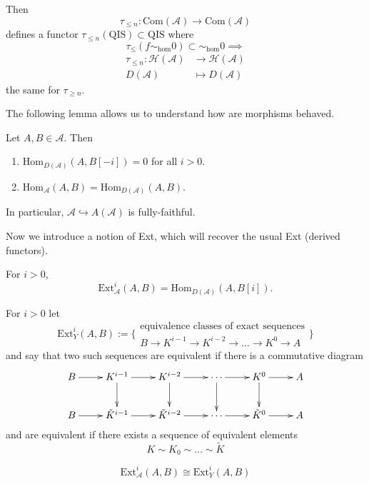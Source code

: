 Then
$$
\tau_{\leq n}:\text{Com}(\mathcal{A}) \to
\text{Com}(\mathcal{A})
$$
defines a functor $\tau_{\leq
n}(\text{QIS})\subset \text{QIS}$ where
$$
\tau_{\leq }(f \sim _{\text{hom}}0) \subset
\sim_{\text{hom}}0
\implies
$$
$$
\begin{aligned}
\tau_{\leq n}: \mathcal{H}(\mathcal{A})
&\longrightarrow
\mathcal{H}(\mathcal{A}) \\
D(\mathcal{A}) &\longmapsto D(\mathcal{A})
\end{aligned}
$$
the same for $\tau_{\geq n}$.

\medskip
The following lemma allows us to understand
how are morphisms behaved.

\begin{lemma}
\label{lemma-Homs}
Let $A,B \in \mathcal{A}$. Then
\begin{enumerate}
\item
$\text{Hom}_{D(\mathcal{A})}(A,B[-i])=0$ for
all $i>0$.
\item
$\text{Hom}_{\mathcal{A}}(A,B)=\text{Hom}
_{D(\mathcal{A})}(A,B)$.
\end{enumerate}
In particular, $\mathcal{A} \hookrightarrow
A(\mathcal{A})$ is fully-faithful.
\end{lemma}

Now we introduce a notion of Ext, which will
recover the usual Ext (derived functors).

\begin{definition}
\label{definition-Ext}
For $i>0$,
$$
\text{Ext}^i_{\mathcal{A}}(A,B)=\text{Hom}
_{D(\mathcal{A})}(A,B[i]).
$$
\end{definition}
\begin{definition}[Yoneda]
\label{definition-Yoneda}
For $i>0$ let
$$
\text{Ext}_Y^i(A,B):=
\{\substack{\text{equivalence
classes of exact sequences}\\
B\to K^{i-1}\to K^{i-2}\to \ldots \to K^0 \to
A}\}
$$
and say that two such sequences are
equivalent if there is a commutative diagram
$$
\xymatrix{
B\ar[r]&  K^{i-1}\ar[r]\ar[d]&
K^{i-2}\ar[r]\ar[d]& \cdots\ar[r]\ar[d]
&K^0\ar[r]\ar[d]&A\\
B\ar[r]&  \tilde{K}^{i-1}\ar[r]&
\tilde{K}^{i-2}\ar[r]& \cdots\ar[r]
&\tilde{K}^0\ar[r]&A
}
$$
and are equivalent if there exists a sequence
of equivalent elements
$$
K \sim K_0 \sim \ldots \sim \tilde{K}
$$
\end{definition}

\begin{proposition}
\label{proposition-Ext}
$$
\text{Ext}_{\mathcal{A}}^i(A,B) \cong
\text{Ext}_Y^i(A,B)
$$
\end{proposition}

